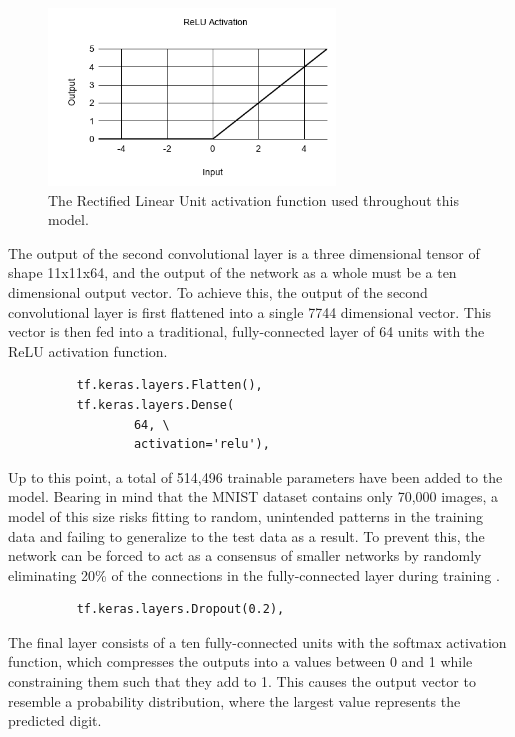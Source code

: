 \documentclass[transmag]{IEEEtran}
\begin{document}
\begin{figure}[H]
  \includegraphics[width=3in]{fig2}
  \caption{The Rectified Linear Unit activation function used throughout 
  this model.\label{fig2}}
\end{figure}

The output of the second convolutional layer is a three dimensional tensor of
shape 11x11x64, and the output of the network as a whole must be a ten 
dimensional output vector. To achieve this, the output of the second 
convolutional layer is first flattened into a single 7744 dimensional vector.
This vector is then fed into a traditional, fully-connected layer of 64 units
with the ReLU activation function.

\begin{figure}[H]
\begin{Verbatim}
    tf.keras.layers.Flatten(),
    tf.keras.layers.Dense(
            64, \
            activation='relu'),
\end{Verbatim}
\end{figure}

Up to this point, a total of 514,496 trainable parameters have been added to
the model. Bearing in mind that the MNIST dataset contains only 70,000 images,
a model of this size risks fitting to random, unintended patterns in the 
training data and failing to generalize to the test data as a result. To
prevent this, the network can be forced to act as a consensus of smaller networks
by randomly eliminating 20\% of the connections in the fully-connected layer
during training \cite{ref5}.

\begin{figure}[H]
\begin{Verbatim}
    tf.keras.layers.Dropout(0.2),
\end{Verbatim}
\end{figure}


The final layer consists of a ten fully-connected units with
the softmax activation function, which compresses the outputs into a values
between 0 and 1 while constraining them such that they add to 1. This causes
the output vector to resemble a probability distribution, where the largest
value represents the predicted digit. 
\end{document}
